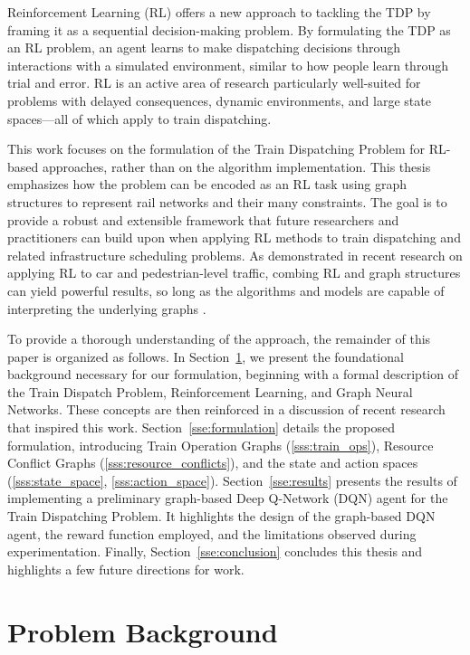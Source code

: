 \documentclass[runningheads]{llncs}
\begin{document}
Reinforcement Learning (RL) offers a new approach to tackling the TDP by framing it as a sequential decision-making problem.
By formulating the TDP as an RL problem, an agent learns to make dispatching decisions through interactions with a simulated environment, similar to how people learn through trial and error. 
RL is an active area of research particularly well-suited for problems with delayed consequences, dynamic environments, and large state spaces—all of which apply to train dispatching. 

This work focuses on the formulation of the Train Dispatching Problem for RL-based approaches, rather than on the algorithm implementation. 
This thesis emphasizes how the problem can be encoded as an RL task using graph structures to represent rail networks and their many constraints. 
The goal is to provide a robust and extensible framework that future researchers and practitioners can build upon when applying RL methods to train dispatching and related infrastructure scheduling problems.
As demonstrated in recent research on applying RL to car and pedestrian-level traffic, combing RL and graph structures can yield powerful results, so long as the algorithms and models are capable of interpreting the underlying graphs \cite{gnndrl:Devailly_2022}.

To provide a thorough understanding of the approach, the remainder of this paper is organized as follows. 
In Section~\ref{sse:background}, we present the foundational background necessary for our formulation, beginning with a formal description of the Train Dispatch Problem, Reinforcement Learning, and Graph Neural Networks.
These concepts are then reinforced in a discussion of recent research that inspired this work.
Section~\ref{sse:formulation} details the proposed formulation, introducing Train Operation Graphs (\ref{sss:train_ops}), Resource Conflict Graphs (\ref{sss:resource_conflicts}), and the state and action spaces (\ref{sss:state_space}, \ref{sss:action_space}). 
Section~\ref{sse:results} presents the results of implementing a preliminary graph-based Deep Q-Network (DQN) agent for the Train Dispatching Problem. 
It highlights the design of the graph-based DQN agent, the reward function employed, and the limitations observed during experimentation.
Finally, Section~\ref{sse:conclusion} concludes this thesis and highlights a few future directions for work.



\section{Problem Background}
\label{sse:background}
\end{document}
